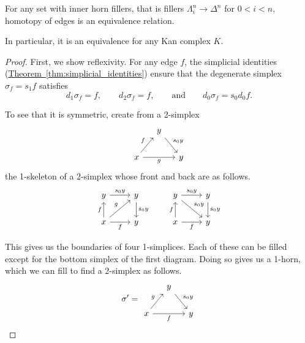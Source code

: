 \documentclass[main.tex]{subfiles}
\begin{document}
\begin{theorem}
  \label{thm:homotopy_of_edges_is_equivalence_relation}
  For any set with inner horn fillers, that is fillers $\Lambda^{n}_{i} \to \Delta^{n}$ for $0 < i < n$, homotopy of edges is an equivalence relation. 
  
  In particular, it is an equivalence for any Kan complex $K$.
\end{theorem}
\begin{proof}
  First, we show reflexivity. For any edge $f$, the simplicial identities (\hyperref[thm:simplicial_identities]{Theorem~\ref*{thm:simplicial_identities}}) ensure that the degenerate simplex $\sigma_{f} = s_{1}f$ satisfies
  \begin{equation*}
    d_{1}\sigma_{f} = f,\qquad d_{2}\sigma_{f} = f,\qquad\text{and}\qquad d_{0}\sigma_{f} = s_{0}d_{0}f.
  \end{equation*}

  To see that it is symmetric, create from a 2-simplex
  \begin{equation*}
    \begin{tikzcd}[column sep=small]
      & y
      \arrow[dr, "s_{0}y"]
      \\
      x
      \arrow[ur, "f"]
      \arrow[rr, swap, "g"]
      && y
    \end{tikzcd}
  \end{equation*}
  the 1-skeleton of a 2-simplex whose front and back are as follows.
  \begin{equation*}
    \begin{tikzcd}
      y
      \arrow[r, "s_{0}y"]
      & y
      \arrow[d, "s_{0}y"]
      \\
      x
      \arrow[r, swap, "f"]
      \arrow[u, "f"]
      \arrow[ur, "g"]
      & y
    \end{tikzcd}
    \qquad
    \begin{tikzcd}
      y
      \arrow[r, "s_{0}y"]
      \arrow[dr, "s_{0}y"]
      & y
      \arrow[d, "s_{0}y"]
      \\
      x
      \arrow[r, swap, "f"]
      \arrow[u, "f"]
      & y
    \end{tikzcd}
  \end{equation*}

  This gives us the boundaries of four 1-simplices. Each of these can be filled except for the bottom simplex of the first diagram. Doing so gives us a 1-horn, which we can fill to find a 2-simplex as follows.
  \begin{equation*}
    \sigma' =
    \begin{tikzcd}[column sep=small]
      & y
      \arrow[dr, "s_{0}y"]
      \\
      x
      \arrow[ur, "g"]
      \arrow[rr, swap, "f"]
      && y
    \end{tikzcd}
  \end{equation*}


\end{proof}
\end{document}
